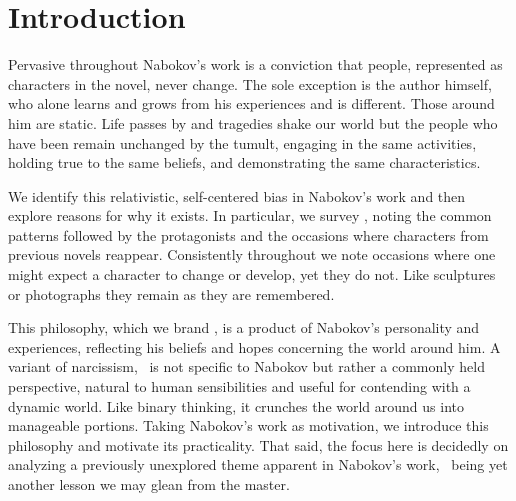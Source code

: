 \section{Introduction}
\label{intro}

Pervasive throughout Nabokov's work is a conviction that people, represented as characters in the novel, never change. 
The sole exception is the author himself, who alone learns and grows from his experiences and is different.
Those around him are static.
Life passes by and tragedies shake our world but the people who have been remain unchanged by the tumult, engaging in the same activities, holding true to the same beliefs, and demonstrating the same characteristics.

We identify this relativistic, self-centered bias in Nabokov's work and then explore reasons for why it exists.
In particular, we survey , noting the common patterns followed by the protagonists and the occasions where characters from previous novels reappear.
Consistently throughout we note occasions where one might expect a character to change or develop, yet they do not.
Like sculptures or photographs they remain as they are remembered.

This philosophy, which we brand \emph{\philo}, is a product of Nabokov's personality and experiences, reflecting his beliefs and hopes concerning the world around him.
A variant of narcissism, \philo~is not specific to Nabokov but rather a commonly held perspective, natural to human sensibilities and useful for contending with a dynamic world.
Like binary thinking, it crunches the world around us into manageable portions.
Taking Nabokov's work as motivation, we introduce this philosophy and motivate its practicality.
That said, the focus here is decidedly on analyzing a previously unexplored theme apparent in Nabokov's work, \philo~being yet another lesson we may glean from the master.

